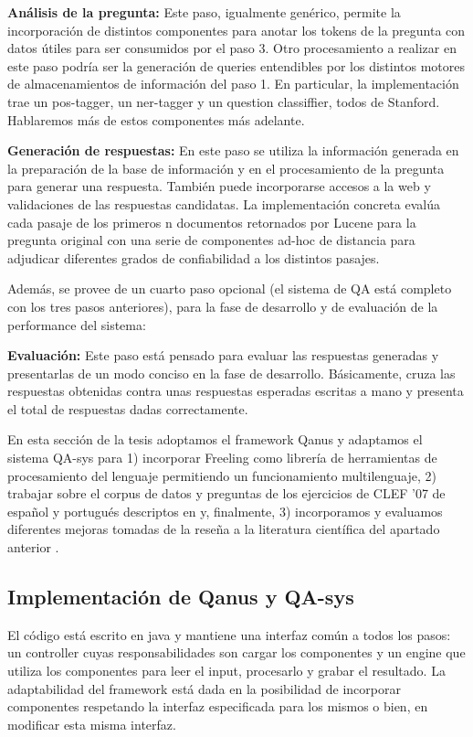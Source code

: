 \textbf{Análisis de la pregunta: } Este paso, igualmente genérico, permite la incorporación de
distintos componentes para anotar los tokens de la pregunta con datos
útiles para ser consumidos por el paso 3. Otro procesamiento a
realizar en este paso podría ser la generación de queries
entendibles por los distintos motores de almacenamientos de
información del paso 1. En particular, la implementación trae un
pos-tagger, un ner-tagger y un question classiffier, todos de Stanford.
Hablaremos más de estos componentes más adelante. \newline

\textbf{Generación de respuestas: } En este paso se utiliza la información generada en la preparación
de la base de información y en el procesamiento de la pregunta para
generar una respuesta. También puede incorporarse accesos a la web y
validaciones de las respuestas candidatas. La implementación concreta
evalúa cada pasaje de los primeros n documentos retornados por Lucene
para la pregunta original con una serie de componentes ad-hoc de
distancia para adjudicar diferentes grados de confiabilidad a los
distintos pasajes. \newline


Además, se provee de un cuarto paso opcional (el sistema de QA está
completo con los tres pasos anteriores), para la fase de desarrollo y
de evaluación de la performance del sistema:\newline


\textbf{Evaluación: }Este paso está pensado para evaluar las respuestas generadas y
presentarlas de un modo conciso en la fase de desarrollo.
Básicamente, cruza las respuestas obtenidas contra unas respuestas
esperadas escritas a mano y presenta el total de respuestas dadas
correctamente.\newline

En esta sección de la tesis adoptamos el framework Qanus y adaptamos el sistema QA-sys para 1) incorporar Freeling como librería de herramientas de procesamiento del lenguaje permitiendo un funcionamiento multilenguaje, 2) trabajar sobre el corpus de datos y preguntas de los ejercicios de CLEF '07 de español y portugués descriptos en  y, finalmente, 3) incorporamos y evaluamos diferentes mejoras tomadas de la reseña a la literatura científica del apartado anterior .

\subsection{Implementación de Qanus y QA-sys}
El código está escrito en java y mantiene una interfaz común a
todos los pasos: un controller cuyas responsabilidades son cargar los
componentes y un engine que utiliza los componentes para leer el input,
procesarlo y grabar el resultado. La adaptabilidad del framework está
dada en la posibilidad de incorporar componentes respetando la interfaz
especificada para los mismos o bien, en modificar esta misma interfaz.

